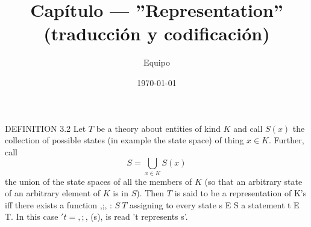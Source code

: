 \title{Capítulo — ''Representation'' (traducción y codificación)}
\author{Equipo}
\date{\today}
\maketitle

\noindent DEFINITION 3.2 Let $T$ be a theory about entities of kind $K$ and call $S(x)$
the collection of possible states (in example the state space) of thing $x \in K$. Further,
call 
\[
S=\bigcup\limits_{x\in K}S(x)
\]
the union of the state spaces of all the members of $K$
(so that an arbitrary state of an arbitrary element of $K$ is in $S$). Then $T$
is said to be a representation of K's iff there exists a function ,;, : $S ~ T$
assigning to every state s E S a statement t E T. In this case $'t = ,;$, (s), is
read 't represents s'.
